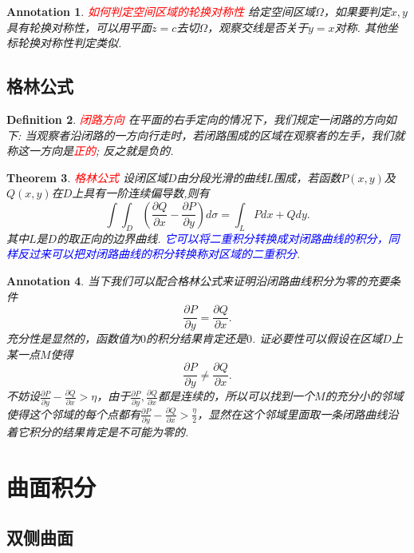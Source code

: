 \documentclass{article}
\newtheorem{theorem}{Theorem}[section]
\newtheorem{definition}[theorem]{Definition}
\newtheorem{annotation}[theorem]{Annotation}
\newcommand{\redt}[1]{\textcolor{red}{#1}}
\newcommand{\bluet}[1]{\textcolor{blue}{#1}}
\begin{document}
\begin{annotation}
\rm \redt{如何判定空间区域的轮换对称性} 给定空间区域$\Omega$，如果要判定$x,y$具有轮换对称性，可以用平面$z=c$去切$\Omega$，观察交线是否关于$y=x$对称.  其他坐标轮换对称性判定类似. 
\end{annotation}

\subsection{格林公式}

\begin{definition}
\rm \redt{闭路方向} 在平面的右手定向的情况下，我们规定一闭路的方向如下: 当观察者沿闭路的一方向行走时，若闭路围成的区域在观察者的左手，我们就称这一方向是\redt{正的}; 反之就是负的. 
\end{definition}

\begin{theorem}
\rm \redt{格林公式} 设闭区域$D$由分段光滑的曲线$L$围成，若函数$P(x,y)$及$Q(x,y)$在$D$上具有一阶连续偏导数,则有
$$
\int\int_D \left( \frac{\partial Q}{\partial x} - \frac{\partial P}{\partial y} \right)d\sigma = \int_L Pdx+Qdy.
$$
其中$L$是$D$的取正向的边界曲线. \bluet{它可以将二重积分转换成对闭路曲线的积分，同样反过来可以把对闭路曲线的积分转换称对区域的二重积分}. 
\end{theorem}

\begin{annotation}
\rm 当下我们可以配合格林公式来证明沿闭路曲线积分为零的充要条件
$$
\frac{\partial P}{\partial y} = \frac{\partial Q}{\partial x}.
$$
充分性是显然的，函数值为$0$的积分结果肯定还是$0$. 证必要性可以假设在区域$D$上某一点$M$使得
$$
\frac{\partial P}{\partial y} \neq \frac{\partial Q}{\partial x}.
$$
不妨设$\frac{\partial P}{\partial y} - \frac{\partial Q}{\partial x} > \eta$，由于$\frac{\partial P}{\partial y} ,\frac{\partial Q}{\partial x}$都是连续的，所以可以找到一个$M$的充分小的邻域使得这个邻域的每个点都有$\frac{\partial P}{\partial y} - \frac{\partial Q}{\partial x} > \frac{\eta}{2}$，显然在这个邻域里面取一条闭路曲线沿着它积分的结果肯定是不可能为零的. 
\end{annotation}

\newpage
\section{曲面积分}

\subsection{双侧曲面}
\end{document}
